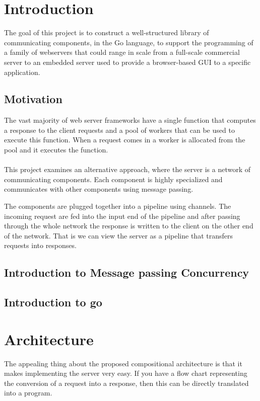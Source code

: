 \documentclass[12pt,a4paper]{article}
\begin{document}
\section{Introduction}
The goal of this project is to construct a well-structured
library of communicating components, in the Go language, to support
the programming of a family of webservers that could range in scale from a full-scale commercial server to an embedded server used to provide a browser-based GUI to a specific application.

\subsection{Motivation}
The vast majority of web server frameworks have a single function that
computes a response to the client requests and a pool of workers that can
be used to execute this function. When a request comes in a worker is 
allocated from the pool and it executes the function.
\\
\\
This project examines an alternative approach, where the server is a network 
of communicating components. Each component is highly specialized and communicates
with other components using message passing.

The components are plugged together into a pipeline using channels.
The incoming request are fed into the input end of the pipeline and 
after passing through the whole network the response is written to the
client on the other end of the network. That is we can view the server
as a pipeline that transfers requests into responses.

\subsection{Introduction to Message passing Concurrency}

\subsection{Introduction to go}

\newpage
\section{Architecture}
The appealing thing about the proposed compositional architecture is that
it makes implementing the server very easy. If you have a flow chart 
representing the conversion of a request into a response, then this can be directly
translated into a program.
\end{document}
